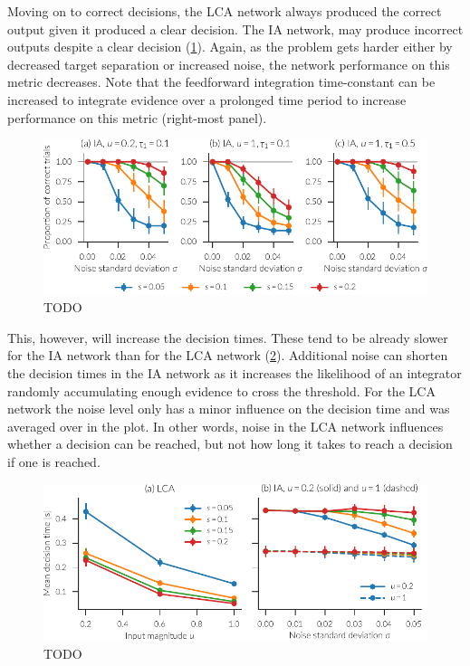 Moving on to correct decisions, the LCA network always produced the correct output given it produced a clear decision.
The IA network, may produce incorrect outputs despite a clear decision (\cref{fig:ia-correct}).
Again, as the problem gets harder either by decreased target separation or increased noise, the network performance on this metric decreases.
Note that the feedforward integration time-constant can be increased to integrate evidence over a prolonged time period  to increase performance on this metric (right-most panel).
\begin{figure}
    \centering
    \includegraphics{figures/ia-correct}
    \caption{TODO}\label{fig:ia-correct}
\end{figure}

This, however, will increase the decision times.
These tend to be already slower for the IA network than for the LCA network (\cref{fig:ia-time}).
Additional noise can shorten the decision times in the IA network as it increases the likelihood of an integrator randomly accumulating enough evidence to cross the threshold.
For the LCA network the noise level only has a minor influence on the decision time and was averaged over in the plot.
In other words, noise in the LCA network influences whether a decision can be reached, but not how long it takes to reach a decision if one is reached.
\begin{figure}
    \centering
    \includegraphics{figures/ia-time}
    \caption{TODO}\label{fig:ia-time}
\end{figure}

